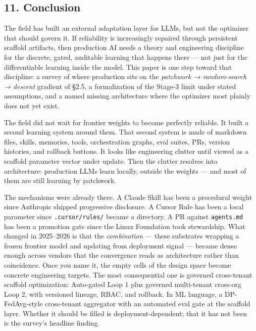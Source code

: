 \documentclass[
]{article}
\begin{document}
\subsection{11. Conclusion}\label{conclusion}

The field has built an external adaptation layer for LLMs, but not the
optimizer that should govern it. If reliability is increasingly repaired
through persistent scaffold artifacts, then production AI needs a theory
and engineering discipline for the discrete, gated, auditable learning
that happens there --- not just for the differentiable learning inside
the model. This paper is one step toward that discipline: a survey of
where production sits on the \emph{patchwork → random-search → descent}
gradient of §2.5, a formalization of the Stage-3 limit under stated
assumptions, and a named missing architecture where the optimizer most
plainly does not yet exist.

The field did not wait for frontier weights to become perfectly
reliable. It built a second learning system around them. That second
system is made of markdown files, skills, memories, tools, orchestration
graphs, eval suites, PRs, version histories, and rollback buttons. It
looks like engineering clutter until viewed as a scaffold parameter
vector under update. Then the clutter resolves into architecture:
production LLMs learn locally, outside the weights --- and most of them
are still learning by patchwork.

The mechanisms were already there. A Claude Skill has been a procedural
weight since Anthropic shipped progressive disclosure. A Cursor Rule has
been a local parameter since \texttt{.cursor/rules/} became a directory.
A PR against \texttt{agents.md} has been a promotion gate since the
Linux Foundation took stewardship. What changed in 2025--2026 is that
the \emph{combination} --- these substrates wrapping a frozen frontier
model and updating from deployment signal --- became dense enough across
vendors that the convergence reads as architecture rather than
coincidence. Once you name it, the empty cells of the design space
become concrete engineering targets. The most consequential one is
governed cross-tenant scaffold optimization: Auto-gated Loop 1 plus
governed multi-tenant cross-org Loop 2, with versioned lineage, RBAC,
and rollback. In ML language, a DP-FedAvg-style cross-tenant aggregator
with an automated eval gate at the scaffold layer. Whether it should be
filled is deployment-dependent; that it has not been is the survey's
headline finding.
\end{document}
